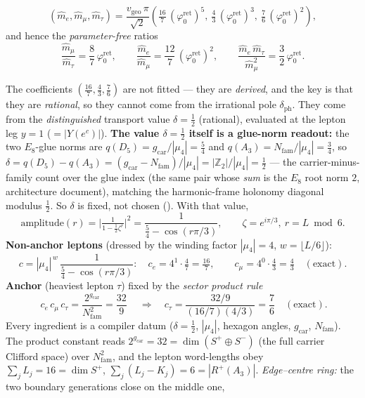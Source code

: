 \documentclass[11pt,a4paper]{article}
\newcommand{\gcar}{g_{\mathrm{car}}}
\newcommand{\Nfam}{N_{\mathrm{fam}}}
\newcommand{\phiz}{\varphi_0^{\mathrm{ret}}}
\newcommand{\Z}{\mathbb{Z}}
\newcommand{\vgeo}{v_{\mathrm{geo}}}
\theoremstyle{definition}
\begin{document}
\begin{keybox}
\[
  (\hat m_e,\hat m_\mu,\hat m_\tau)=\frac{\vgeo\,\pi}{\sqrt2}\left(\tfrac{16}{7}\,(\phiz)^{5},\ \tfrac{4}{3}\,(\phiz)^{3},\ \tfrac{7}{6}\,(\phiz)^{2}\right),
\]
and hence the \emph{parameter-free} ratios
\[
  \frac{\hat m_\mu}{\hat m_\tau}=\frac{8}{7}\,\phiz,\qquad
  \frac{\hat m_e}{\hat m_\mu}=\frac{12}{7}\,(\phiz)^{2},\qquad
  \frac{\hat m_e\,\hat m_\tau}{\hat m_\mu^{2}}=\frac{3}{2}\,\phiz .
\]
\end{keybox}

\begin{keybox}[Where the lepton rationals come from: $\delta=\tfrac12$ resolvent $+$ product rule \mE]
The coefficients $(\tfrac{16}{7},\tfrac43,\tfrac76)$ are not fitted --- they are \emph{derived}, and the
key is that they are \emph{rational}, so they cannot come from the irrational pole $\delta_{\mathrm{ph}}$.
They come from the \emph{distinguished} transport value $\delta=\tfrac12$ (rational), evaluated at the
lepton leg $y=1$ ($=|Y(e^c)|$). \textbf{The value $\delta=\tfrac12$ itself is a glue-norm readout:} the two $E_8$-glue norms are
$q(D_5)=\gcar/|\mu_4|=\tfrac54$ and $q(A_3)=\Nfam/|\mu_4|=\tfrac34$, so
$\delta=q(D_5)-q(A_3)=(\gcar-\Nfam)/|\mu_4|=|\Z_2|/|\mu_4|=\tfrac12$ --- the carrier-minus-family count over
the glue index (the same pair whose \emph{sum} is the $E_8$ root norm $2$, architecture document), matching the
harmonic-frame holonomy diagonal modulus $\tfrac12$. So $\delta$ is fixed, not chosen
(). With that value,
\[
  \text{amplitude}(r)=\Big|\tfrac{1}{1-\tfrac12\zeta^{r}}\Big|^{2}=\frac{1}{\tfrac54-\cos(r\pi/3)},
  \qquad \zeta=e^{i\pi/3},\ r=L\bmod 6 .
\]
\textbf{Non-anchor leptons} (dressed by the winding factor $|\mu_4|=4$, $w=\lfloor L/6\rfloor$):
\[
  c=|\mu_4|^{\,w}\,\frac{1}{\tfrac54-\cos(r\pi/3)}:\quad
  c_e=4^{1}\!\cdot\!\tfrac{4}{7}=\tfrac{16}{7},\qquad
  c_\mu=4^{0}\!\cdot\!\tfrac{4}{3}=\tfrac{4}{3}\quad(\text{exact}).
\]
\textbf{Anchor} (heaviest lepton $\tau$) fixed by the \emph{sector product rule}
\[
  \boxed{\ c_e\,c_\mu\,c_\tau=\frac{2^{\gcar}}{\Nfam^{2}}=\frac{32}{9}\ }
  \quad\Longrightarrow\quad c_\tau=\frac{32/9}{(16/7)(4/3)}=\frac{7}{6}\quad(\text{exact}).
\]
Every ingredient is a compiler datum ($\delta{=}\tfrac12$, $|\mu_4|$, hexagon angles, $\gcar$, $\Nfam$).
The product constant reads $2^{\gcar}=32=\dim(S^+\!\oplus S^-)$ (the full carrier Clifford space) over
$\Nfam^2$, and the lepton word-lengths obey $\sum_j L_j=16=\dim S^+$, $\sum_j(L_j-K_j)=6=|R^+(A_3)|$.
\emph{Edge--centre ring:} the two boundary generations close on the middle one,

\end{keybox}
\end{document}
